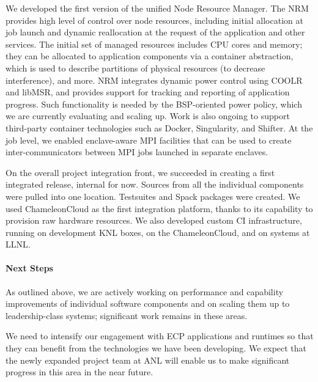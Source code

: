 We developed the first version of the unified Node Resource Manager.  The
NRM provides high level of control over node resources, including initial
allocation at job launch and dynamic reallocation at the request of the
application and other services.  The initial set of managed resources
includes CPU cores and memory; they can be allocated to application
components via a container abstraction, which is used to describe
partitions of physical resources (to decrease interference), and more.  NRM
integrates dynamic power control using COOLR and libMSR, and provides
support for tracking and reporting of application progress.  Such
functionality is needed by the BSP-oriented power policy, which we are
currently evaluating and scaling up.  Work is also ongoing to support
third-party container technologies such as Docker, Singularity, and
Shifter.  At the job level, we enabled enclave-aware MPI facilities that
can be used to create inter-communicators between MPI jobs launched in
separate enclaves.

On the overall project integration front, we succeeded in creating a first
integrated release, internal for now.  Sources from all the individual
components were pulled into one location.  Testsuites and Spack packages
were created.  We used ChameleonCloud as the first integration platform,
thanks to its capability to provision raw hardware resources.  We also
developed custom CI infrastructure, running on development KNL boxes,
on the ChameleonCloud, and on systems at LLNL.



\paragraph{Next Steps}

As outlined above, we are actively working on performance and capability
improvements of individual software components and on scaling them up to
leadership-class systems; significant work remains in these areas.

We need to intensify our engagement with ECP applications and runtimes so
that they can benefit from the technologies we have been developing.  We
expect that the newly expanded project team at ANL will enable us to make
significant progress in this area in the near future.

